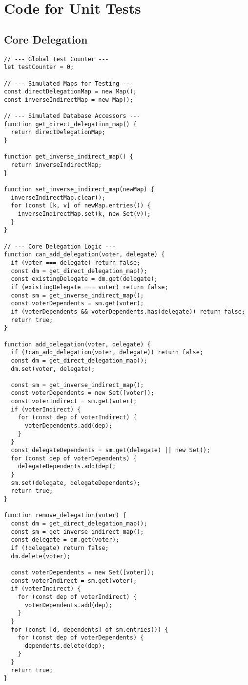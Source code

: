 \chapter{Code for Unit Tests}\label{appendix:unit_test}
\section{Core Delegation}
\begin{verbatim}
// --- Global Test Counter ---
let testCounter = 0;

// --- Simulated Maps for Testing ---
const directDelegationMap = new Map();
const inverseIndirectMap = new Map();

// --- Simulated Database Accessors ---
function get_direct_delegation_map() {
  return directDelegationMap;
}

function get_inverse_indirect_map() {
  return inverseIndirectMap;
}

function set_inverse_indirect_map(newMap) {
  inverseIndirectMap.clear();
  for (const [k, v] of newMap.entries()) {
    inverseIndirectMap.set(k, new Set(v));
  }
}

// --- Core Delegation Logic ---
function can_add_delegation(voter, delegate) {
  if (voter === delegate) return false;
  const dm = get_direct_delegation_map();
  const existingDelegate = dm.get(delegate);
  if (existingDelegate === voter) return false;
  const sm = get_inverse_indirect_map();
  const voterDependents = sm.get(voter);
  if (voterDependents && voterDependents.has(delegate)) return false;
  return true;
}

function add_delegation(voter, delegate) {
  if (!can_add_delegation(voter, delegate)) return false;
  const dm = get_direct_delegation_map();
  dm.set(voter, delegate);

  const sm = get_inverse_indirect_map();
  const voterDependents = new Set([voter]);
  const voterIndirect = sm.get(voter);
  if (voterIndirect) {
    for (const dep of voterIndirect) {
      voterDependents.add(dep);
    }
  }
  const delegateDependents = sm.get(delegate) || new Set();
  for (const dep of voterDependents) {
    delegateDependents.add(dep);
  }
  sm.set(delegate, delegateDependents);
  return true;
}

function remove_delegation(voter) {
  const dm = get_direct_delegation_map();
  const sm = get_inverse_indirect_map();
  const delegate = dm.get(voter);
  if (!delegate) return false;
  dm.delete(voter);

  const voterDependents = new Set([voter]);
  const voterIndirect = sm.get(voter);
  if (voterIndirect) {
    for (const dep of voterIndirect) {
      voterDependents.add(dep);
    }
  }
  for (const [d, dependents] of sm.entries()) {
    for (const dep of voterDependents) {
      dependents.delete(dep);
    }
  }
  return true;
}


\end{verbatim}
